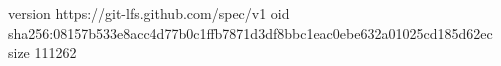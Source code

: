 version https://git-lfs.github.com/spec/v1
oid sha256:08157b533e8acc4d77b0c1ffb7871d3df8bbc1eac0ebe632a01025cd185d62ec
size 111262

